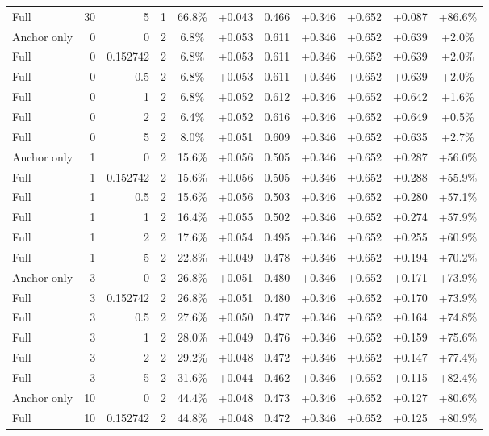 \begin{table}[htbp]
\begin{tabular}{lrrrccccccc}
Full & 30 & 5 & 1 & 66.8\% & +0.043 & 0.466 & +0.346 & +0.652 & +0.087 & +86.6\% \\
Anchor only & 0 & 0 & 2 & 6.8\% & +0.053 & 0.611 & +0.346 & +0.652 & +0.639 & +2.0\% \\
Full & 0 & 0.152742 & 2 & 6.8\% & +0.053 & 0.611 & +0.346 & +0.652 & +0.639 & +2.0\% \\
Full & 0 & 0.5 & 2 & 6.8\% & +0.053 & 0.611 & +0.346 & +0.652 & +0.639 & +2.0\% \\
Full & 0 & 1 & 2 & 6.8\% & +0.052 & 0.612 & +0.346 & +0.652 & +0.642 & +1.6\% \\
Full & 0 & 2 & 2 & 6.4\% & +0.052 & 0.616 & +0.346 & +0.652 & +0.649 & +0.5\% \\
Full & 0 & 5 & 2 & 8.0\% & +0.051 & 0.609 & +0.346 & +0.652 & +0.635 & +2.7\% \\
Anchor only & 1 & 0 & 2 & 15.6\% & +0.056 & 0.505 & +0.346 & +0.652 & +0.287 & +56.0\% \\
Full & 1 & 0.152742 & 2 & 15.6\% & +0.056 & 0.505 & +0.346 & +0.652 & +0.288 & +55.9\% \\
Full & 1 & 0.5 & 2 & 15.6\% & +0.056 & 0.503 & +0.346 & +0.652 & +0.280 & +57.1\% \\
Full & 1 & 1 & 2 & 16.4\% & +0.055 & 0.502 & +0.346 & +0.652 & +0.274 & +57.9\% \\
Full & 1 & 2 & 2 & 17.6\% & +0.054 & 0.495 & +0.346 & +0.652 & +0.255 & +60.9\% \\
Full & 1 & 5 & 2 & 22.8\% & +0.049 & 0.478 & +0.346 & +0.652 & +0.194 & +70.2\% \\
Anchor only & 3 & 0 & 2 & 26.8\% & +0.051 & 0.480 & +0.346 & +0.652 & +0.171 & +73.9\% \\
Full & 3 & 0.152742 & 2 & 26.8\% & +0.051 & 0.480 & +0.346 & +0.652 & +0.170 & +73.9\% \\
Full & 3 & 0.5 & 2 & 27.6\% & +0.050 & 0.477 & +0.346 & +0.652 & +0.164 & +74.8\% \\
Full & 3 & 1 & 2 & 28.0\% & +0.049 & 0.476 & +0.346 & +0.652 & +0.159 & +75.6\% \\
Full & 3 & 2 & 2 & 29.2\% & +0.048 & 0.472 & +0.346 & +0.652 & +0.147 & +77.4\% \\
Full & 3 & 5 & 2 & 31.6\% & +0.044 & 0.462 & +0.346 & +0.652 & +0.115 & +82.4\% \\
Anchor only & 10 & 0 & 2 & 44.4\% & +0.048 & 0.473 & +0.346 & +0.652 & +0.127 & +80.6\% \\
Full & 10 & 0.152742 & 2 & 44.8\% & +0.048 & 0.472 & +0.346 & +0.652 & +0.125 & +80.9\% \\

\end{tabular}
\end{table}
